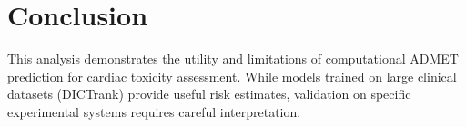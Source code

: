 \documentclass[11pt]{article}
\begin{document}
\section{Conclusion}

This analysis demonstrates the utility and limitations of computational ADMET prediction for cardiac toxicity assessment. While models trained on large clinical datasets (DICTrank) provide useful risk estimates, validation on specific experimental systems requires careful interpretation.
\end{document}
